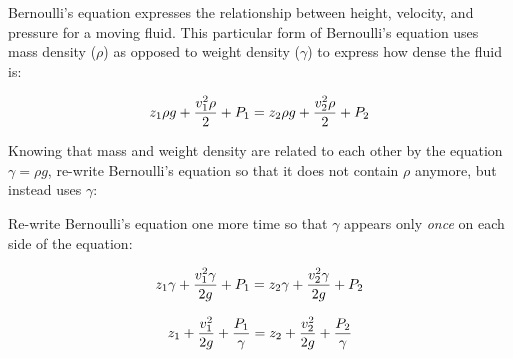 

Bernoulli's equation expresses the relationship between height, velocity, and pressure for a moving fluid.  This particular form of Bernoulli's equation uses mass density ($\rho$) as opposed to weight density ($\gamma$) to express how dense the fluid is:

$$z_1 \rho g + {v_1^2 \rho \over 2} + P_1 = z_2 \rho g + {v_2^2 \rho \over 2} + P_2$$

Knowing that mass and weight density are related to each other by the equation $\gamma = \rho g$, re-write Bernoulli's equation so that it does not contain $\rho$ anymore, but instead uses $\gamma$:

\vskip 100pt

Re-write Bernoulli's equation one more time so that $\gamma$ appears only {\it once} on each side of the equation:

\vskip 100pt







$$z_1 \gamma + {v_1^2 \gamma \over 2g} + P_1 = z_2 \gamma + {v_2^2 \gamma \over 2g} + P_2$$

$$z_1 + {v_1^2 \over 2g} + {P_1 \over \gamma} = z_2 + {v_2^2 \over 2g} + {P_2 \over \gamma}$$











